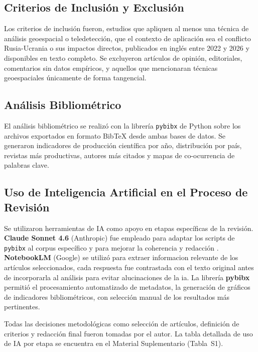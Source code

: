 \documentclass[12pt, a4paper]{article}
\begin{document}
\subsection{Criterios de Inclusión y Exclusión}

Los criterios de inclusión fueron, estudios que apliquen al menos una técnica de análisis geoespacial o teledetección, que el contexto de aplicación sea el conflicto Rusia-Ucrania o sus impactos directos, publicados en inglés entre 2022 y 2026 y  disponibles en texto completo. Se excluyeron artículos de opinión, editoriales, comentarios sin datos empíricos, y aquellos que mencionaran técnicas geoespaciales únicamente de forma tangencial.

\clearpage

\subsection{Análisis Bibliométrico}

El análisis bibliométrico se realizó con la librería \texttt{pybibx} de Python sobre los archivos exportados en formato BibTeX desde ambas bases de datos. Se generaron indicadores de producción científica por año, distribución por país, revistas más productivas, autores más citados y mapas de co-ocurrencia de palabras clave.

\subsection{Uso de Inteligencia Artificial en el Proceso de Revisión}

Se utilizaron  herramientas de IA como apoyo en etapas específicas de la revisión. \textbf{Claude Sonnet 4.6} (Anthropic) fue empleado para adaptar los scripts de \texttt{pybibx} al corpus específico y para mejorar la coherencia y redacción . \textbf{NotebookLM} (Google) se utilizó para extraer informacion relevante de los artículos seleccionados, cada respuesta fue contrastada con el texto original antes de incorporarla al análisis para evitar alucinaciones de la ia. La librería \textbf{pybibx} permitió el procesamiento automatizado de metadatos, la generación de gráficos  de indicadores bibliométricos, con selección manual de los resultados más pertinentes.

Todas las decisiones metodológicas como selección de artículos, definición de criterios y redacción final  fueron tomadas por el autor. La tabla detallada de uso de IA por etapa se encuentra en el Material Suplementario (Tabla~S1).
\end{document}
